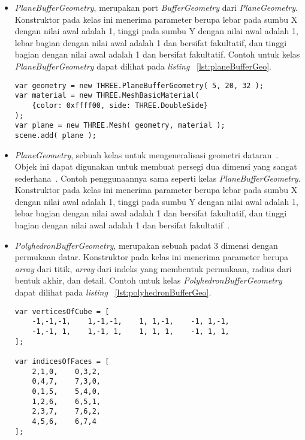 \begin{itemize}
\begin{itemize}
		\item {\it PlaneBufferGeometry}, merupakan port {\it BufferGeometry} dari {\it PlaneGeometry}. Konstruktor pada kelas ini menerima parameter berupa lebar pada sumbu X dengan nilai awal adalah 1, tinggi pada sumbu Y dengan nilai awal adalah 1, lebar bagian dengan nilai awal adalah 1 dan bersifat fakultatif, dan tinggi bagian dengan nilai awal adalah 1 dan bersifat fakultatif. Contoh untuk kelas {\it PlaneBufferGeometry} dapat dilihat pada {\it listing} ~\ref{lst:planeBufferGeo}.
	
\begin{lstlisting}[caption={Contoh penggunaan kelas {\it PlaneBufferGeometry}.}, label={lst:planeBufferGeo},captionpos=b]
var geometry = new THREE.PlaneBufferGeometry( 5, 20, 32 );
var material = new THREE.MeshBasicMaterial( 
	{color: 0xffff00, side: THREE.DoubleSide} 
);
var plane = new THREE.Mesh( geometry, material );
scene.add( plane );
\end{lstlisting}
		\item {\it PlaneGeometry}, sebuah kelas untuk mengeneralisasi geometri dataran~\cite{threejs}. Objek ini dapat digunakan untuk membuat persegi dua dimensi yang sangat sederhana~\cite{learningThreejs}. Contoh penggunaannya sama seperti kelas {\it PlaneBufferGeometry}. Konstruktor pada kelas ini menerima parameter berupa lebar pada sumbu X dengan nilai awal adalah 1, tinggi pada sumbu Y dengan nilai awal adalah 1, lebar bagian dengan nilai awal adalah 1 dan bersifat fakultatif, dan tinggi bagian dengan nilai awal adalah 1 dan bersifat fakultatif~\cite{threejs}.
		\item {\it PolyhedronBufferGeometry}, merupakan sebuah padat 3 dimensi dengan permukaan datar. Konstruktor pada kelas ini menerima parameter berupa {\it array} dari titik, {\it array} dari indeks yang membentuk permukaan, radius dari bentuk akhir, dan detail. Contoh untuk kelas {\it PolyhedronBufferGeometry} dapat dilihat pada {\it listing} ~\ref{lst:polyhedronBufferGeo}.
	
\begin{lstlisting}[caption={Contoh penggunaan kelas {\it PolyhedronBufferGeometry}.}, label={lst:polyhedronBufferGeo},captionpos=b]
var verticesOfCube = [
    -1,-1,-1,    1,-1,-1,    1, 1,-1,    -1, 1,-1,
    -1,-1, 1,    1,-1, 1,    1, 1, 1,    -1, 1, 1,
];

var indicesOfFaces = [
    2,1,0,    0,3,2,
    0,4,7,    7,3,0,
    0,1,5,    5,4,0,
    1,2,6,    6,5,1,
    2,3,7,    7,6,2,
    4,5,6,    6,7,4
];


\end{lstlisting}
\end{itemize}
\end{itemize}
